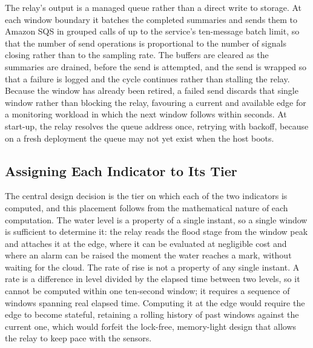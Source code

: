 \documentclass[conference]{IEEEtran}
\begin{document}
The relay's output is a managed queue rather than a direct write to storage. At each window boundary it batches the completed summaries and sends them to Amazon SQS in grouped calls of up to the service's ten-message batch limit, so that the number of send operations is proportional to the number of signals closing rather than to the sampling rate. The buffers are cleared as the summaries are drained, before the send is attempted, and the send is wrapped so that a failure is logged and the cycle continues rather than stalling the relay. Because the window has already been retired, a failed send discards that single window rather than blocking the relay, favouring a current and available edge for a monitoring workload in which the next window follows within seconds. At start-up, the relay resolves the queue address once, retrying with backoff, because on a fresh deployment the queue may not yet exist when the host boots.

\subsection{Assigning Each Indicator to Its Tier}

The central design decision is the tier on which each of the two indicators is computed, and this placement follows from the mathematical nature of each computation. The water level is a property of a single instant, so a single window is sufficient to determine it: the relay reads the flood stage from the window peak and attaches it at the edge, where it can be evaluated at negligible cost and where an alarm can be raised the moment the water reaches a mark, without waiting for the cloud. The rate of rise is not a property of any single instant. A rate is a difference in level divided by the elapsed time between two levels, so it cannot be computed within one ten-second window; it requires a sequence of windows spanning real elapsed time. Computing it at the edge would require the edge to become stateful, retaining a rolling history of past windows against the current one, which would forfeit the lock-free, memory-light design that allows the relay to keep pace with the sensors.
\end{document}
